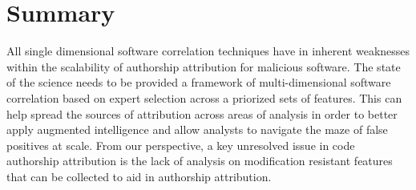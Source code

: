 \documentclass[12pt]{report}
\begin{document}

\section{Summary}
All single dimensional software correlation techniques have in inherent weaknesses within the scalability of authorship attribution for malicious software.  The state of the science needs to be provided a framework of multi-dimensional software correlation based on expert selection across a priorized sets of features.  This can help spread the sources of attribution across areas of analysis in order to better apply augmented intelligence and allow analysts to navigate the maze of false positives at scale.  From our perspective, a key unresolved issue in code authorship attribution is the lack of analysis on modification resistant features that can be collected to aid in authorship attribution.

\end{document}
